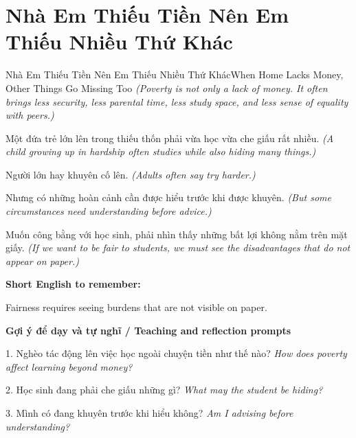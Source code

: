 \section{Nhà Em Thiếu Tiền Nên Em Thiếu Nhiều Thứ Khác}
\begin{truyen}{Nhà Em Thiếu Tiền Nên Em Thiếu Nhiều Thứ Khác}{When Home Lacks Money, Other Things Go Missing Too}
\textit{(Poverty is not only a lack of money. It often brings less security, less parental time, less study space, and less sense of equality with peers.)}

Một đứa trẻ lớn lên trong thiếu thốn phải vừa học vừa che giấu rất nhiều.
\textit{(A child growing up in hardship often studies while also hiding many things.)}

Người lớn hay khuyên cố lên.
\textit{(Adults often say try harder.)}

Nhưng có những hoàn cảnh cần được hiểu trước khi được khuyên.
\textit{(But some circumstances need understanding before advice.)}

\end{truyen}

\begin{baihoc}
Muốn công bằng với học sinh, phải nhìn thấy những bất lợi không nằm trên mặt giấy.
\textit{(If we want to be fair to students, we must see the disadvantages that do not appear on paper.)}
\end{baihoc}

\begin{ghinhoanh}
\textbf{Short English to remember:}

Fairness requires seeing burdens that are not visible on paper.

\end{ghinhoanh}

\begin{tuhocnhanh}
\textbf{Gợi ý để dạy và tự nghĩ / Teaching and reflection prompts}

1. Nghèo tác động lên việc học ngoài chuyện tiền như thế nào? \textit{How does poverty affect learning beyond money?}

2. Học sinh đang phải che giấu những gì? \textit{What may the student be hiding?}

3. Mình có đang khuyên trước khi hiểu không? \textit{Am I advising before understanding?}
\end{tuhocnhanh}
\ngancach

